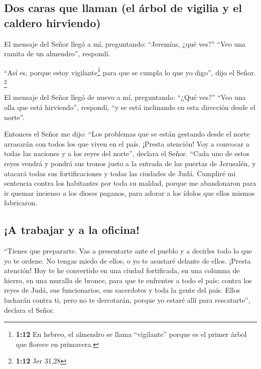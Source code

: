 \hypertarget{dos-caras-que-llaman-el-uxe1rbol-de-vigilia-y-el-caldero-hirviendo}{%
\subsection{Dos caras que llaman (el árbol de vigilia y el caldero
hirviendo)}\label{dos-caras-que-llaman-el-uxe1rbol-de-vigilia-y-el-caldero-hirviendo}}

 El mensaje del Señor llegó a mí, preguntando:
``Jeremías, ¿qué ves?'' ``Veo una ramita de un almendro'', respondí.

 ``Así es, porque estoy vigilante\footnote{\textbf{1:12}
  En hebreo, el almendro se llama ``vigilante'' porque es el primer
  árbol que florece en primavera.} para que se cumpla lo que yo digo'',
dijo el Señor. \footnote{\textbf{1:12} Jer 31,28}

 El mensaje del Señor llegó de nuevo a mí, preguntando:
``¿Qué ves?'' ``Veo una olla que está hirviendo'', respondí, ``y se está
inclinando en esta dirección desde el norte''.

 Entonces el Señor me dijo: ``Los problemas que se están
gestando desde el norte arrasarán con todos los que viven en el país.
 ¡Presta atención! Voy a convocar a todas las naciones y
a los reyes del norte'', declara el Señor. ``Cada uno de estos reyes
vendrá y pondrá sus tronos justo a la entrada de las puertas de
Jerusalén, y atacará todas sus fortificaciones y todas las ciudades de
Judá.  Cumpliré mi sentencia contra los habitantes por
toda su maldad, porque me abandonaron para ir quemar incienso a los
dioses paganos, para adorar a los ídolos que ellos mismos fabricaron.

\hypertarget{a-trabajar-y-a-la-oficina}{%
\subsection{¡A trabajar y a la
oficina!}\label{a-trabajar-y-a-la-oficina}}

 ``Tienes que prepararte. Vas a presentarte ante el
pueblo y a decirles todo lo que yo te ordene. No tengas miedo de ellos,
o yo te asustaré delante de ellos.  ¡Presta atención! Hoy
te he convertido en una ciudad fortificada, en una columna de hierro, en
una muralla de bronce, para que te enfrentes a todo el país: contra los
reyes de Judá, sus funcionarios, sus sacerdotes y toda la gente del
país.  Ellos lucharán contra ti, pero no te derrotarán,
porque yo estaré allí para rescatarte'', declara el Señor.

